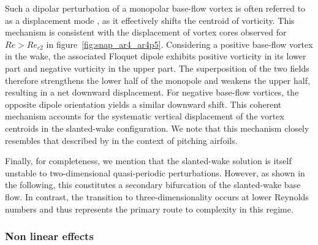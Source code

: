 Such a dipolar perturbation of a monopolar base-flow vortex is often referred to as a displacement mode \citep{brion-sipp-jacquin-2014}, as it effectively shifts the centroid of vorticity. This mechanism is consistent with the displacement of vortex cores observed for $Re>Re_{c2}$ in figure~\ref{fig:snap_ar4_ar4p5}. Considering a positive base-flow vortex in the wake, the associated Floquet dipole exhibits positive vorticity in its lower part and negative vorticity in the upper part. The superposition of the two fields therefore strengthens the lower half of the monopole and weakens the upper half, resulting in a net downward displacement. For negative base-flow vortices, the opposite dipole orientation yields a similar downward shift. This coherent mechanism accounts for the systematic vertical displacement of the vortex centroids in the slanted-wake configuration.
%
We note that this mechanism closely resembles that described by \citet{jallas-marquet-fabre-2017} in the context of pitching airfoils.

Finally, for completeness, we mention that the slanted-wake solution is itself unstable to two-dimensional quasi-periodic perturbations. However, as shown in the following, this constitutes a secondary bifurcation of the slanted-wake base flow. In contrast, the transition to three-dimensionality occurs at lower Reynolds numbers and thus represents the primary route to complexity in this regime.

\subsubsection{Non linear effects}

